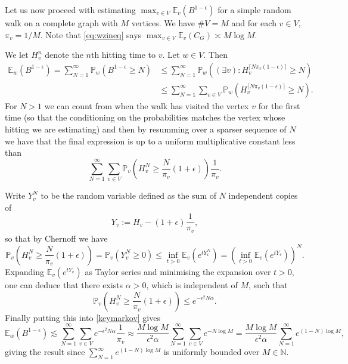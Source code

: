 \documentclass[11pt, reqno]{amsart}
\numberwithin{equation}{section}
\theoremstyle{plain}%
\theoremstyle{definition}
\def\N{\ensuremath{\mathbb N}}
\def\E{\mathbb E}
\theoremstyle{nonumberplain}
\begin{document}
Let us now proceed with estimating $\max_{v \in V} \mathbb{E}_v( B^{1-\epsilon})$ for a simple random walk on a complete graph with $M$ vertices. We have $\#V = M$ and for each $v \in V$, $\pi_v=1/M$. Note that \eqref{eq:wzineq} says $\max_{v \in V} \E_v(C_G) \asymp M \log M$. 

We let  $H_v^n$ denote the $n$th hitting time to $v$. Let $w \in V$. Then
\begin{align*}
\E_w(B^{1-\epsilon})= \sum_{N=1}^\infty \mathbb{P}_w(B^{1-\epsilon} \geq N)& \leq \sum_{N=1}^\infty \mathbb{P}_w((\exists v): H_v^{\lceil N \pi_v(1-\epsilon)\rceil} \geq N) \nonumber\\
& \leq  \sum_{N=1}^\infty  \sum_{v \in V} \mathbb{P}_w( H_v^{\lceil N \pi_v(1-\epsilon)\rceil} \geq N).
\end{align*}
For $N>1$ we can count from when the walk has visited the vertex $v$ for the first time (so that the conditioning on the probabilities matches the vertex whose hitting we are estimating) and then by resumming over a sparser sequence of $N$ we have that the final expression is up to a uniform multiplicative constant less than
\begin{equation} \sum_{N=1}^\infty \sum_{v \in V}\mathbb{P}_v\left( H_v^{N } \geq \frac{N}{\pi_v} (1+\epsilon)\right) \frac{1}{\pi_v}. \label{keymarkov}
\end{equation}

Write $Y_{v}^N$ to be the random variable defined as the sum of $N$ independent copies of
$$Y_v:= H_v-(1+\epsilon)\frac{1}{\pi_v},$$
so that by Chernoff we have
\begin{equation} \label{ldpmarkov}
\mathbb{P}_v\left( H_v^{N } \geq \frac{N}{\pi_v} (1+\epsilon)\right)=\mathbb{P}_v(Y_{v}^N \geq 0) \leq \inf_{t>0} \E_v(e^{tY_{v}^N})=\left(\inf_{t>0} \E_v(e^{tY_v})\right)^N.
\end{equation}
Expanding $\E_v(e^{tY_v})$ as Taylor series and minimising the expansion over $t>0$, one can deduce that there exists $\alpha>0$, which is independent of $M$, such that
$$\mathbb{P}_v\left( H_v^{N } \geq \frac{N}{\pi_v} (1+\epsilon)\right) \leq e^{-\epsilon^2 N \alpha}.$$
Finally putting this into \eqref{keymarkov} gives
$$\E_w(B^{1-\epsilon}) \lesssim \sum_{N=1}^\infty \sum_{v \in V} e^{-\epsilon^2 N \alpha} \frac{1}{\pi_v} \approx \frac{M \log M}{\epsilon^2 \alpha}  \sum_{N=1}^\infty \sum_{v \in V} e^{-N \log M}=  \frac{M \log M}{\epsilon^2 \alpha} \sum_{N=1}^\infty e^{(1-N) \log M},$$
giving the result since $\sum_{N=1}^\infty e^{(1-N) \log M}$ is uniformly bounded over $M \in \N$.
\end{document}
